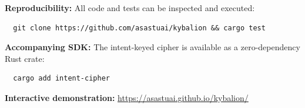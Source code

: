 \documentclass[12pt,a4paper]{article}
\begin{document}
\medskip
\noindent\textbf{Reproducibility:} All code and tests can be inspected and executed:
\begin{verbatim}
  git clone https://github.com/asastuai/kybalion && cargo test
\end{verbatim}

\noindent\textbf{Accompanying SDK:} The intent-keyed cipher is available as a zero-dependency Rust crate:
\begin{verbatim}
  cargo add intent-cipher
\end{verbatim}

\noindent\textbf{Interactive demonstration:} \url{https://asastuai.github.io/kybalion/}

\end{document}
